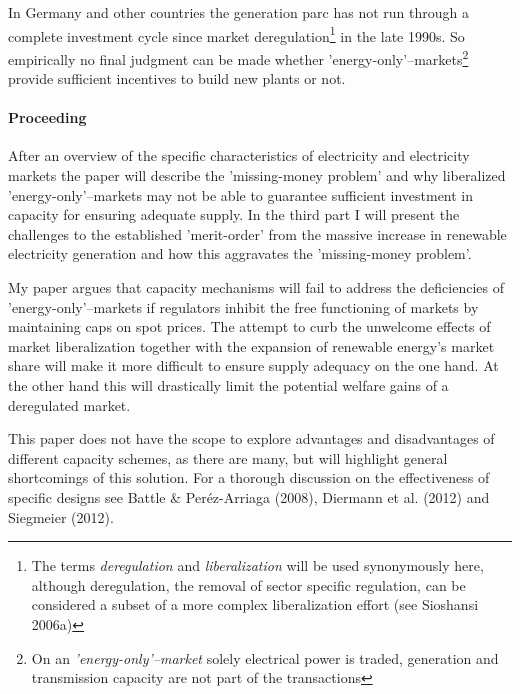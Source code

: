 \documentclass[11pt,a4paper,english]{scrreprt}
\begin{document}
In Germany and other countries the generation parc has not run through a
complete investment cycle since market deregulation\footnote{The terms
\emph{deregulation} and \emph{liberalization} will be used synonymously here,
although deregulation, the removal of sector specific regulation, can be
considered a subset of a more complex liberalization effort (see Sioshansi
2006a)} in the late 1990s. So empirically no final judgment can be made
whether 'energy-only'--markets\footnote{On an \emph{'energy-only'--market}
solely electrical power is traded, generation and transmission capacity are not
part of the transactions} provide sufficient incentives to build new plants or
not.\par


	\paragraph{Proceeding}

After an overview of the specific characteristics of electricity and
electricity markets the paper will describe the 'missing-money problem' and why
liberalized 'energy-only'--markets may not be able to guarantee sufficient
investment in capacity for ensuring adequate supply. In the third part I will
present the challenges to the established 'merit-order' from the massive
increase in renewable electricity generation and how this aggravates the
'missing-money problem'.\par


My paper argues that capacity mechanisms will fail to address the deficiencies
of 'energy-only'--markets if regulators inhibit the free functioning of markets
by maintaining caps on spot prices. The attempt to curb the unwelcome effects of
market liberalization together with the expansion of renewable energy's market
share will make it more difficult to ensure supply adequacy on the one hand. At
the other hand this will drastically limit the potential welfare gains of a
deregulated market.\par


This paper does not have the scope to explore advantages and disadvantages of
different capacity schemes, as there are many, but will highlight general
shortcomings of this solution. For a thorough discussion on the effectiveness of
specific designs see Battle \& Per\'{e}z-Arriaga (2008), Diermann et al. (2012)
and Siegmeier (2012).\par
\end{document}
